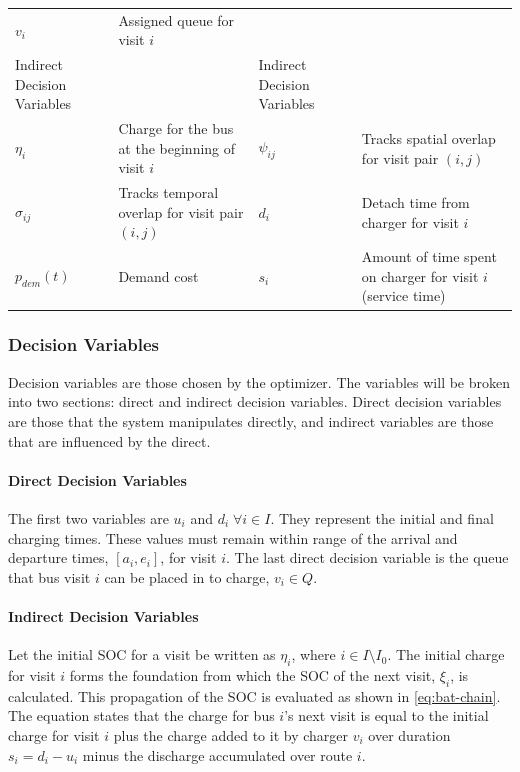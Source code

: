 \documentclass[11pt,a4paper,final]{article}
\newcommand{\Iset}{I}                       %
\newcommand{\Qset}{Q}                       %
\begin{document}
\begin{table}[htbp]
\begin{tabularx}{\textwidth}{L{0.3} L{1.2} L{0.3} L{1.2}}
\(v_i\) & Assigned queue for visit \(i\) &  & \\[0pt]
Indirect Decision Variables &  & Indirect Decision Variables & \\[0pt]
\(\eta_i\) & Charge for the bus at the beginning of visit \(i\) & \(\psi_{ij}\) & Tracks spatial overlap for visit pair \((i,j)\)\\[0pt]
\(\sigma_{ij}\) & Tracks temporal overlap for visit pair \((i,j)\) & \(d_i\) & Detach time from charger for visit \(i\)\\[0pt]
\(p_{dem}(t)\) & Demand cost & \(s_i\) & Amount of time spent on charger for visit \(i\) (service time)\\[0pt]
\hline
\end{tabularx}
\end{table}

\subsubsection{Decision Variables}
\label{sec:decision-variables}
Decision variables are those chosen by the optimizer. The variables will be broken into two sections: direct and
indirect decision variables. Direct decision variables are those that the system manipulates directly, and indirect
variables are those that are influenced by the direct.

\paragraph{Direct Decision Variables}
\label{sec:direct-decision-variables}
The first two variables are \(u_i\) and \(d_i \; \forall i \in \Iset\). They represent the initial and final charging times. These
values must remain within range of the arrival and departure times, \([a_i, e_i]\), for visit \(i\). The last direct
decision variable is the queue that bus visit \(i\) can be placed in to charge, \(v_i \in \Qset\).

\paragraph{Indirect Decision Variables}
\label{sec:indirect-decision-variables}
Let the initial SOC for a visit be written as \(\eta_i\), where \(i \in \Iset \setminus \Iset_0\). The initial charge for visit \(i\) forms
the foundation from which the SOC of the next visit, \(\xi_i\), is calculated. This propagation of the SOC is evaluated as
shown in \ref{eq:bat-chain}. The equation states that the charge for bus \(i\)'s next visit is equal to the initial charge for
visit \(i\) plus the charge added to it by charger \(v_i\) over duration \(s_i = d_i - u_i\) minus the discharge accumulated
over route \(i\).
\end{document}
